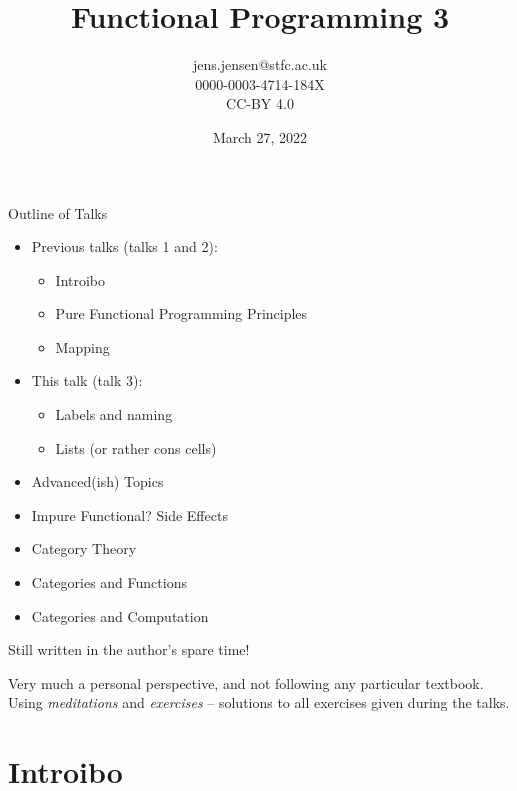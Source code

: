 \documentclass[presentation]{beamer}
\author{jens.jensen@stfc.ac.uk \\0000-0003-4714-184X\\CC-BY 4.0}
\date{March 27, 2022}
\title{Functional Programming 3}
\begin{document}
\maketitle
\begin{frame}{Outline of Talks}

  \begin{itemize}
    \item Previous talks (talks 1 and 2):
    \begin{itemize}
\item Introibo
\item Pure Functional Programming Principles
    \item Mapping

    \end{itemize}

  \item This talk (talk 3):
    \begin{itemize}
    \item Labels and naming
    \item Lists (or rather cons cells)
    \end{itemize}

  \item Advanced(ish) Topics
\item Impure Functional? Side Effects
\item Category Theory
\item Categories and Functions
\item Categories and Computation

  \end{itemize}
Still written in the author's spare time!

\medskip

Very much a personal perspective, and not following any particular textbook.  Using \emph{meditations} and \emph{exercises} -- solutions to all exercises given during the talks.

\end{frame}


\section{Introibo}
\label{sec:org0edb596}
\end{document}
